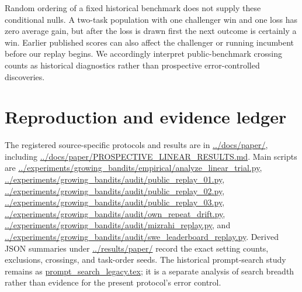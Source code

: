 \documentclass[11pt]{article}
\begin{document}
Random ordering of a fixed historical benchmark does not supply these conditional nulls. A two-task population with one challenger win and one loss has zero average gain, but after the loss is drawn first the next outcome is certainly a win. Earlier published scores can also affect the challenger or running incumbent before our replay begins. We accordingly interpret public-benchmark crossing counts as historical diagnostics rather than prospective error-controlled discoveries.

\section{Reproduction and evidence ledger}
The registered source-specific protocols and results are in \url{../docs/paper/}, including \url{../docs/paper/PROSPECTIVE_LINEAR_RESULTS.md}. Main scripts are \url{../experiments/growing_bandits/empirical/analyze_linear_trial.py}, \url{../experiments/growing_bandits/audit/public_replay_01.py}, \url{../experiments/growing_bandits/audit/public_replay_02.py}, \url{../experiments/growing_bandits/audit/public_replay_03.py}, \url{../experiments/growing_bandits/audit/own_repeat_drift.py}, \url{../experiments/growing_bandits/audit/mizrahi_replay.py}, and \url{../experiments/growing_bandits/audit/swe_leaderboard_replay.py}. Derived JSON summaries under \url{../results/paper/} record the exact setting counts, exclusions, crossings, and task-order seeds. The historical prompt-search study remains as \url{prompt_search_legacy.tex}; it is a separate analysis of search breadth rather than evidence for the present protocol's error control.
\end{document}
